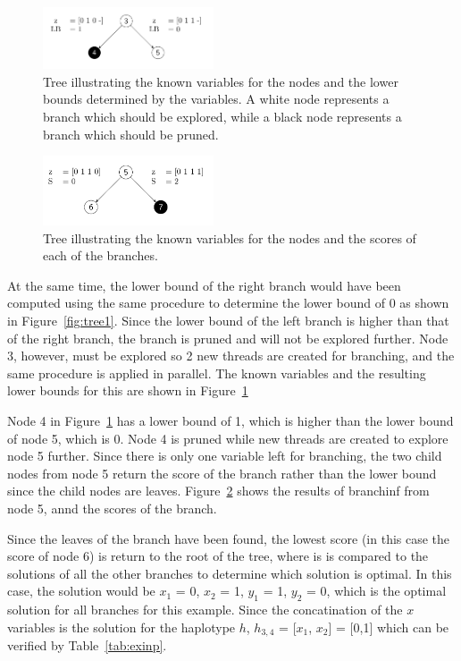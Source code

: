 \documentclass[10pt,twocolumn]{article}
\begin{document}
\begin{figure}[t!]
    \centering
    \includegraphics[width=0.45\textwidth]{tree3}
    \caption{Tree illustrating the known variables for the nodes and the lower bounds determined by the
    variables. A white node represents a branch which should be explored, while a black node represents a
branch which should be pruned.}
    \label{fig:tree3}
\end{figure}
\begin{figure}[b!]
    \centering
    \includegraphics[width=0.45\textwidth]{tree5}
    \caption{Tree illustrating the known variables for the nodes and the scores of each of the branches.}
    \label{fig:tree5}
\end{figure}

At the same time, the lower bound of the right branch would have been computed using the same procedure to
determine the lower bound of 0 as shown in Figure~\ref{fig:tree1}.
Since the lower bound of the left branch is higher than that of the right branch, the branch is pruned and
will not be explored further. Node 3, however, must be explored so 2 new threads are created for branching, 
and the same procedure is applied in parallel. The known variables and the resulting lower bounds for
this are shown in Figure~\ref{fig:tree3}

Node 4 in Figure~\ref{fig:tree3} has a lower bound of 1, which is higher than the lower bound of node 5, which
is 0. Node 4 is pruned while new threads are created to explore node 5 further. Since there is only one
variable left for branching, the two child nodes from node 5 return the score of the branch rather than the lower
bound since the child nodes are leaves. Figure~\ref{fig:tree5} shows the results of branchinf from node 5,
annd the scores of the branch.

Since the leaves of the branch have been found, the lowest score (in this case the score of node 6) is return
to the root of the tree, where is is compared to the solutions of all the other branches to determine which
solution is optimal. In this case, the solution would be $x_1$ = 0, $x_2$ = 1, $y_1$ = 1, $y_2$ = 0, which is
the optimal solution for all branches for this example. Since the concatination of the $x$ variables is the 
solution for the haplotype $h$, $h_{3,4}$ = [$x_1$, $x_2$] = [0,1] which can be verified by
Table~\ref{tab:exinp}.
\end{document}
